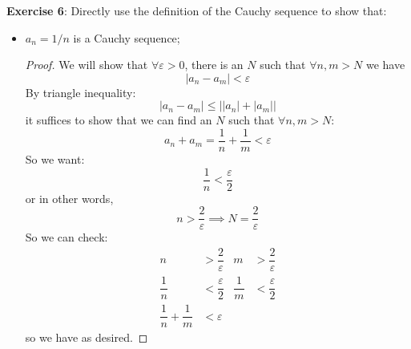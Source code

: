 \documentclass{article}
\begin{document}
\textbf{Exercise 6}: Directly use the definition of the Cauchy sequence to show that:
    \begin{itemize}
        \item $a_{n} = 1/n$ is a Cauchy sequence;
            \begin{proof}
                We will show that $\forall \varepsilon > 0$, there is an $N$ such that $\forall n, m > N$ we have
                    \begin{equation*}
                        \lvert a_{n} - a_{m} \rvert < \varepsilon
                    \end{equation*}
                By triangle inequality:
                    \begin{equation*}
                        \lvert a_{n} - a_{m} \rvert \leq \lvert \lvert a_{n} \rvert + \lvert a_{m} \rvert \rvert
                    \end{equation*}
                it suffices to show that we can find an $N$ such that $\forall n, m > N$:
                    \begin{equation*}
                        a_{n} + a_{m} = \dfrac{1}{n} + \dfrac{1}{m} < \varepsilon
                    \end{equation*}
                So we want:
                    \begin{equation*}
                        \dfrac{1}{n} < \dfrac{\varepsilon}{2}
                    \end{equation*}
                or in other words,
                    \begin{equation*}
                        n > \dfrac{2}{\varepsilon} \implies N = \dfrac{2}{\varepsilon}
                    \end{equation*}
                So we can check:
                    \begin{align*}
                        n                           &>  \dfrac{2}{\varepsilon} & m            &>  \dfrac{2}{\varepsilon} \\
                        \dfrac{1}{n}                &<  \dfrac{\varepsilon}{2} & \dfrac{1}{m} &<  \dfrac{\varepsilon}{2} \\
                        \dfrac{1}{n} + \dfrac{1}{m} &<  \varepsilon            &              &                            
                    \end{align*}
                so we have as desired.
            \end{proof}


\end{itemize}
\end{document}
